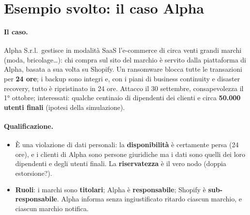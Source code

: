 \section{Esempio svolto: il caso Alpha}
\label{sec:breach-alpha}

\paragraph{Il caso.} Alpha S.r.l.\ gestisce in modalità SaaS l'e-commerce di circa venti grandi marchi
(moda, bricolage\ldots): chi compra sul sito del marchio è servito dalla piattaforma di Alpha, basata a
sua volta su Shopify. Un ransomware blocca tutte le transazioni per \textbf{24 ore}; i backup sono integri
e, con i piani di business continuity e disaster recovery, tutto è ripristinato in 24 ore. Attacco il 30
settembre, consapevolezza il 1° ottobre; interessati: qualche centinaio di dipendenti dei clienti e circa
\textbf{50.000 utenti finali} (ipotesi della simulazione).

\paragraph{Qualificazione.}
\begin{itemize}
  \item È una violazione di dati personali: la \textbf{disponibilità} è certamente persa (24 ore), e i
    clienti di Alpha sono persone giuridiche ma i dati sono quelli dei loro dipendenti e degli utenti
    finali. La \textbf{riservatezza} è il vero nodo (doppia estorsione?).
  \item \textbf{Ruoli}: i marchi sono \textbf{titolari}; Alpha è \textbf{responsabile}; Shopify è
    \textbf{sub-responsabile}. Alpha informa senza ingiustificato ritardo ciascun marchio, e ciascun
    marchio notifica.
\end{itemize}

